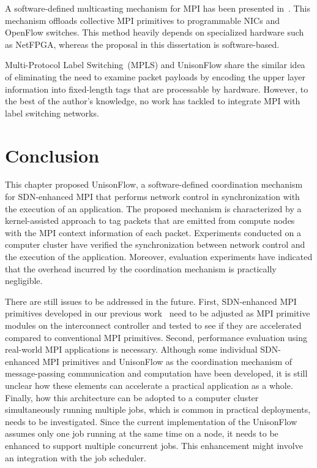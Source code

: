 A software-defined multicasting mechanism for MPI has been presented
in~\autocite{Arap2014}. This mechanism offloads collective MPI primitives to
programmable NICs and OpenFlow switches. This method heavily depends on
specialized hardware such as NetFPGA, whereas the proposal in this
dissertation is software-based.

Multi-Protocol Label Switching~(MPLS) and UnisonFlow share the similar
idea of eliminating the need to examine packet payloads by encoding
the upper layer information into fixed-length tags that are processable by
hardware. However, to the best of the author's knowledge, no work has tackled
to integrate MPI with label switching networks.

\section{Conclusion}\label{sec:iv-conclusion}

This chapter proposed UnisonFlow, a software-defined
coordination mechanism for SDN-enhanced MPI that performs network
control in synchronization with the execution of an application. The
proposed mechanism is characterized by a kernel-assisted approach to tag
packets that are emitted from compute nodes with the MPI context
information of each packet. Experiments conducted on a computer cluster
have verified the synchronization between network control and the
execution of the application. Moreover, evaluation experiments have
indicated that the overhead incurred by the coordination mechanism is
practically negligible.

There are still issues to be addressed in the future. First,
SDN-enhanced MPI primitives developed in our previous
work~\autocite{Dashdavaa2013,Takahashi2014} need to be adjusted as MPI
primitive modules on the interconnect controller and tested to see if
they are accelerated compared to conventional MPI primitives. Second,
performance evaluation using real-world MPI applications is necessary.
Although some individual SDN-enhanced MPI primitives and UnisonFlow as the
coordination mechanism of message-passing communication and computation have
been developed, it is still unclear how these elements can accelerate a
practical application as a whole. Finally, how this architecture can be
adopted to a computer cluster simultaneously running multiple jobs, which is
common in practical deployments, needs to be investigated. Since the current
implementation of the UnisonFlow assumes only one job running at the same time
on a node, it needs to be enhanced to support multiple concurrent jobs. This
enhancement might involve an integration with the job scheduler.
